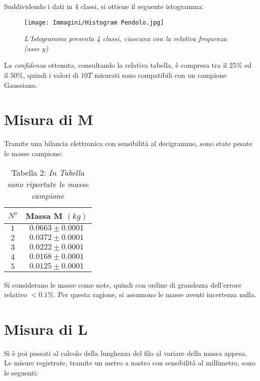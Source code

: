 \documentclass[12pt, a4paper]{article}
\begin{document}
\newpage

Suddividendo i dati in 4 classi, si ottiene il seguente istogramma:

    \begin{figure}[h!]
\centering
\texttt{[image: Immagini/Histogram Pendolo.jpg]}
\caption{\textit{{\footnotesize{L'Istogramma presenta 4 classi, ciascuna con la relativa frequenza (asse $y$) }}}}
\label{Grafico parabolico}
\end{figure}


\bigskip
\addvspace{1.5cm}
La \textit{confidenza} ottenuta, consultando la relativa tabella, è compresa tra il 25\% ed il 50\%, quindi i valori di $10T$ misurati sono compatibili con un campione Gaussiano.

\newpage

\section{Misura di M}
Tramite una bilancia elettronica con sensibilità al decigrammo, sono state pesate le masse campione:

\begin{table}[!htb]
    \centering
        \begin{tabular}{|c|c|}
            \hline
            $N^o$ &Massa M $(kg)$\\
            \hline
            $1$ & $0.0663\pm0.0001$\\
            $2$ & $0.0372\pm0.0001$\\
            $3$ & $0.0222\pm0.0001$\\
            $4$ & $0.0168\pm0.0001$\\
            $5$ & $0.0125\pm0.0001$\\
           
            \hline
        \end{tabular}
        \label{Tab masse}
        \caption*{Tabella 2: \textit{\footnotesize In Tabella sono riportate le masse campione}}
        \end{table}

    Si considerano le masse come note, quindi con ordine di grandezza dell'errore relativo $<0.1\%$. Per questa ragione, si assumono le masse aventi incertezza nulla.


    
\section{Misura di L}
Si è poi passati al calcolo della lunghezza del filo al variare della massa appesa. Le misure registrate, tramite un metro a nastro con sensibilità al millimetro, sono le seguenti:
\end{document}
